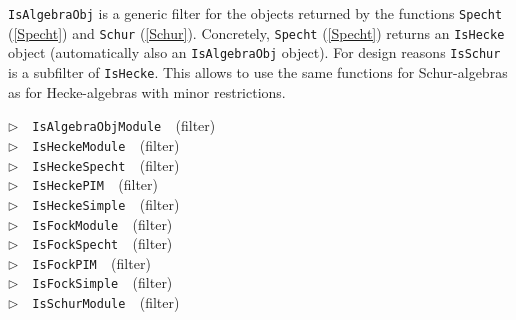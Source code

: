 \documentclass[a4paper,11pt]{report}
\begin{document}
{{{ \texttt{IsAlgebraObj} is a generic filter for the objects returned by the functions \texttt{Specht} (\ref{Specht}) and \texttt{Schur} (\ref{Schur}). Concretely, \texttt{Specht} (\ref{Specht}) returns an \texttt{IsHecke} object (automatically also an \texttt{IsAlgebraObj} object). For design reasons \texttt{IsSchur} is a subfilter of \texttt{IsHecke}. This allows to use the same functions for Schur-algebras as for
Hecke-algebras with minor restrictions.

 \noindent\textcolor{FuncColor}{$\triangleright$\ \ \texttt{IsAlgebraObjModule
\label{IsAlgebraObjModule}
}\hfill{\scriptsize (filter)}}\\
\noindent\textcolor{FuncColor}{$\triangleright$\ \ \texttt{IsHeckeModule
\label{IsHeckeModule}
}\hfill{\scriptsize (filter)}}\\
\noindent\textcolor{FuncColor}{$\triangleright$\ \ \texttt{IsHeckeSpecht
\label{IsHeckeSpecht}
}\hfill{\scriptsize (filter)}}\\
\noindent\textcolor{FuncColor}{$\triangleright$\ \ \texttt{IsHeckePIM
\label{IsHeckePIM}
}\hfill{\scriptsize (filter)}}\\
\noindent\textcolor{FuncColor}{$\triangleright$\ \ \texttt{IsHeckeSimple
\label{IsHeckeSimple}
}\hfill{\scriptsize (filter)}}\\
\noindent\textcolor{FuncColor}{$\triangleright$\ \ \texttt{IsFockModule
\label{IsFockModule}
}\hfill{\scriptsize (filter)}}\\
\noindent\textcolor{FuncColor}{$\triangleright$\ \ \texttt{IsFockSpecht
\label{IsFockSpecht}
}\hfill{\scriptsize (filter)}}\\
\noindent\textcolor{FuncColor}{$\triangleright$\ \ \texttt{IsFockPIM
\label{IsFockPIM}
}\hfill{\scriptsize (filter)}}\\
\noindent\textcolor{FuncColor}{$\triangleright$\ \ \texttt{IsFockSimple
\label{IsFockSimple}
}\hfill{\scriptsize (filter)}}\\
\noindent\textcolor{FuncColor}{$\triangleright$\ \ \texttt{IsSchurModule
\label{IsSchurModule}
}\hfill{\scriptsize (filter)}}\\
}}}
\end{document}
